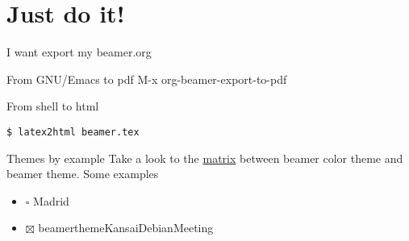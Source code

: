 \documentclass[unicode,presentation,c,squeeze,shrink,10pt]{beamer}
\begin{document}
\section{Just do it!}
\label{sec-3}
\begin{frame}[fragile,label=sec-3-1]{I want export my beamer.org}
 \begin{block}{From GNU/Emacs to pdf}
M-x org-beamer-export-to-pdf
\end{block}
\begin{block}{From shell to html}
\begin{verbatim}
$ latex2html beamer.tex
\end{verbatim}
\end{block}
\end{frame}
\begin{frame}[label=sec-3-2]{Themes by example}
Take a look to the \href{http://deic.uab.es/~iblanes/beamer_gallery/index_by_theme.html}{matrix} between beamer color theme and beamer theme.
Some examples
\begin{itemize}
\item $\square$ Madrid
\item $\boxtimes$ beamerthemeKansaiDebianMeeting
\end{itemize}
\end{frame}
\end{document}
